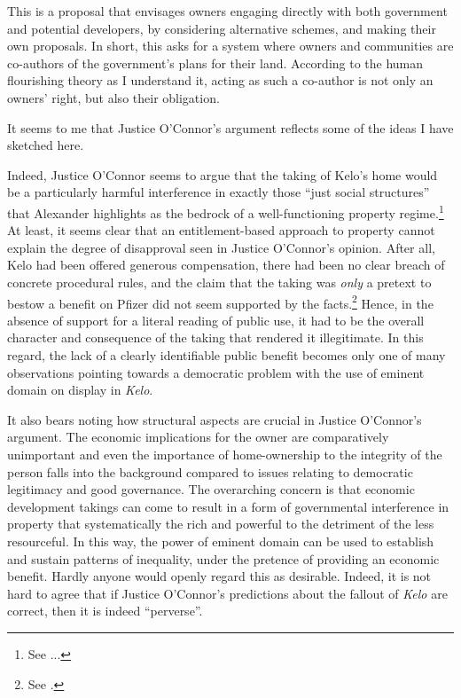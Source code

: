 {This is a proposal that envisages owners engaging directly with both government and potential developers, by considering alternative schemes, and making their own proposals. In short, this asks for a system where owners and communities are co-authors of the government's plans for their land.  According to the human flourishing theory as I understand it, acting as such a co-author is not only an owners' right, but also their obligation. 

It seems to me that Justice O'Connor's argument reflects some of the ideas I have sketched here. 

}

Indeed, Justice O'Connor seems to argue that the taking of Kelo's home would be a particularly harmful interference in exactly those ``just social structures'' that Alexander highlights as the bedrock of a well-functioning property regime.\footnote{See ...} At least, it seems clear that an entitlement-based approach to property cannot explain the degree of disapproval seen in Justice O'Connor's opinion. After all, Kelo had been offered generous compensation, there had been no clear breach of concrete procedural rules, and the claim that the taking was {\it only} a pretext to bestow a benefit on Pfizer did not seem supported by the facts.\footnote{See \cite{bell06}.} Hence, in the absence of support for a literal reading of public use, it had to be the overall character and consequence of the taking that rendered it illegitimate. In this regard, the lack of a clearly identifiable public benefit becomes only one of many observations pointing towards a democratic problem with the use of eminent domain on display in {\it Kelo}.

It also bears noting how structural aspects are crucial in Justice O'Connor's argument. The economic implications for the owner are comparatively unimportant and even the importance of home-ownership to the integrity of the person falls into the background compared to issues relating to democratic legitimacy and good governance. The overarching concern is that economic development takings can come to result in a form of governmental interference in property that systematically  the rich and powerful to the detriment of the less resourceful. In this way, the power of eminent domain can be used to establish and sustain patterns of inequality, under the pretence of providing an economic benefit. Hardly anyone would openly regard this as desirable. Indeed, it is not hard to agree that if Justice O'Connor's predictions about the fallout of {\it Kelo} are correct, then it is indeed ``perverse''. 


